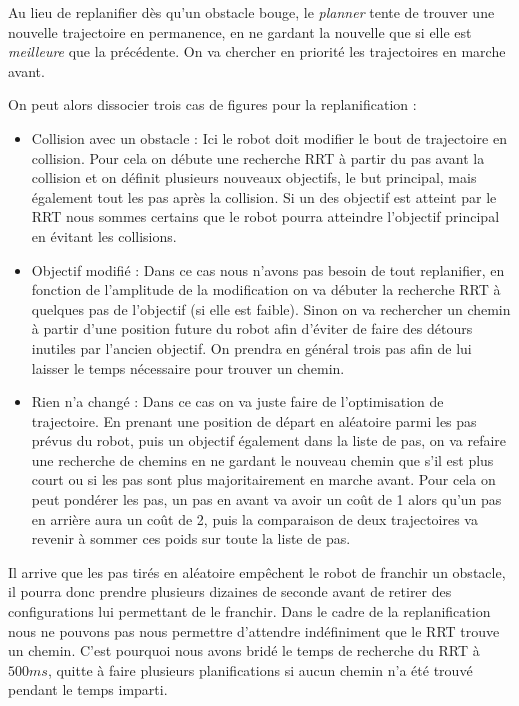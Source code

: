 Au lieu de replanifier dès qu'un obstacle bouge, le \emph{planner} tente de trouver une nouvelle trajectoire en permanence, en ne gardant la nouvelle que si elle est \emph{meilleure} que la précédente. On va chercher en priorité les trajectoires en marche avant. 

On peut alors dissocier trois cas de figures pour la replanification :
\begin{itemize}
\item Collision avec un obstacle : Ici le robot doit modifier le bout de trajectoire en collision. Pour cela on débute une recherche RRT à partir du pas avant la collision et on définit plusieurs nouveaux objectifs, le but principal, mais également tout les pas après la collision. Si un des objectif est atteint par le RRT nous sommes certains que le robot pourra atteindre l'objectif principal en évitant les collisions.
\vspace{3mm}
\item Objectif modifié : Dans ce cas nous n'avons pas besoin de tout replanifier, en fonction de l'amplitude de la modification on va débuter la recherche RRT à quelques pas de l'objectif (si elle est faible). Sinon on va rechercher un chemin à partir d'une position future du robot afin d'éviter de faire des détours inutiles par l'ancien objectif. On prendra en général trois pas afin de lui laisser le temps nécessaire pour trouver un chemin.
\vspace{3mm}
\item Rien n'a changé : Dans ce cas on va juste faire de l'optimisation de trajectoire. En prenant une position de départ en aléatoire parmi les pas prévus du robot, puis un objectif également dans la liste de pas, on va refaire une recherche de chemins en ne gardant le nouveau chemin que s'il est plus court ou si les pas sont plus majoritairement en marche avant. Pour cela on peut pondérer les pas, un pas en avant va avoir un coût de 1 alors qu'un pas en arrière aura un coût de 2, puis la comparaison de deux trajectoires va revenir à sommer ces poids sur toute la liste de pas.

\end{itemize}


Il arrive que les pas tirés en aléatoire empêchent le robot de franchir un obstacle, il pourra donc prendre plusieurs dizaines de seconde avant de retirer des configurations lui permettant de le franchir. Dans le cadre de la replanification nous ne pouvons pas nous permettre d'attendre indéfiniment que le RRT trouve un chemin. C'est pourquoi nous avons bridé le temps de recherche du RRT à $500ms$, quitte à faire plusieurs planifications si aucun chemin n'a été trouvé pendant le temps imparti.

